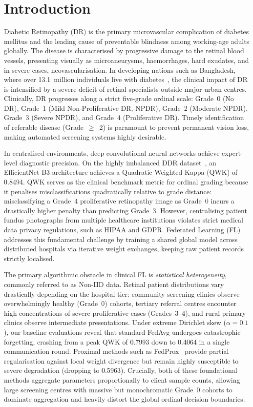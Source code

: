 \section{Introduction}

Diabetic Retinopathy (DR) is the primary microvascular complication
of diabetes mellitus and the leading cause of preventable blindness
among working-age adults globally. The disease is characterised by
progressive damage to the retinal blood vessels, presenting visually
as microaneurysms, haemorrhages, hard exudates, and in severe cases,
neovascularisation. In developing nations such as Bangladesh, where over
13.1~million individuals live with diabetes~\cite{idf2021}, the clinical
impact of DR is intensified by a severe deficit of retinal specialists
outside major urban centres. Clinically, DR progresses along a strict
five-grade ordinal scale: Grade~0 (No DR), Grade~1 (Mild Non-Proliferative
DR, NPDR), Grade~2 (Moderate NPDR), Grade~3 (Severe NPDR), and Grade~4
(Proliferative DR). Timely identification of referable disease (Grade~$\geq$~2)
is paramount to prevent permanent vision loss, making automated screening
systems highly desirable.

In centralised environments, deep convolutional neural networks achieve
expert-level diagnostic precision. On the highly imbalanced DDR dataset~\cite{li2019ddr},
an EfficientNet-B3 architecture achieves a Quadratic Weighted Kappa
(QWK) of 0.8494. QWK serves as the clinical benchmark metric for
ordinal grading because it penalises misclassifications quadratically
relative to grade distance: misclassifying a Grade~4 proliferative
retinopathy image as Grade~0 incurs a drastically higher penalty than
predicting Grade~3. However, centralising patient fundus photographs
from multiple healthcare institutions violates strict medical data
privacy regulations, such as HIPAA and GDPR. Federated Learning (FL)~\cite{mcmahan2017fedavg}
addresses this fundamental challenge by training a shared global model across
distributed hospitals via iterative weight exchanges, keeping raw patient
records strictly localised.

The primary algorithmic obstacle in clinical FL is \emph{statistical
heterogeneity}, commonly referred to as Non-IID data. Retinal patient
distributions vary drastically depending on the hospital tier: community
screening clinics observe overwhelmingly healthy (Grade~0) cohorts,
tertiary referral centres encounter high concentrations of severe
proliferative cases (Grades~3--4), and rural primary clinics observe
intermediate presentations. Under extreme Dirichlet skew ($\alpha=0.1$),
our baseline evaluations reveal that standard FedAvg undergoes catastrophic
forgetting, crashing from a peak QWK of 0.7993 down to 0.4064 in a single
communication round. Proximal methods such as FedProx~\cite{li2020fedprox}
provide partial regularisation against local weight divergence but remain
highly susceptible to severe degradation (dropping to 0.5963). Crucially,
both of these foundational methods aggregate parameters proportionally to
client sample counts, allowing large screening centres with massive but
monochromatic Grade~0 cohorts to dominate aggregation and heavily distort
the global ordinal decision boundaries.

